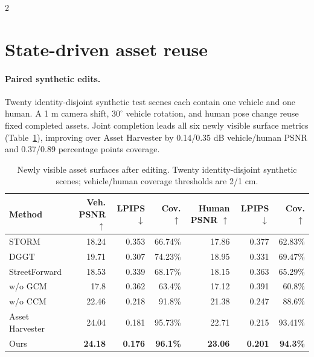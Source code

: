 \begin{multicols}{2}
\section{State-driven asset reuse}
\label{sec:supp-reuse}

\paragraph{Paired synthetic edits.}
Twenty identity-disjoint synthetic test scenes each contain one vehicle and one human. A 1 m camera shift, $30^\circ$ vehicle rotation, and human pose change reuse fixed completed assets. Joint completion leads all six newly visible surface metrics (Table~\ref{tab:asset-reuse}), improving over Asset Harvester by 0.14/0.35 dB vehicle/human PSNR and 0.37/0.89 percentage points coverage.

\end{multicols}
\begin{table}[H]
\centering\small
\setlength{\tabcolsep}{4pt}
\caption{Newly visible asset surfaces after editing. Twenty identity-disjoint synthetic scenes; vehicle/human coverage thresholds are 2/1 cm.}
\label{tab:asset-reuse}
\begin{tabular}{@{}lrrrrrr@{}}
\toprule
Method & Veh. PSNR $\uparrow$ & LPIPS $\downarrow$ & Cov. $\uparrow$ & Human PSNR $\uparrow$ & LPIPS $\downarrow$ & Cov. $\uparrow$ \\
\midrule
STORM & 18.24 & 0.353 & 66.74\% & 17.86 & 0.377 & 62.83\% \\
DGGT & 19.71 & 0.307 & 74.23\% & 18.95 & 0.331 & 69.47\% \\
StreetForward & 18.53 & 0.339 & 68.17\% & 18.15 & 0.363 & 65.29\% \\
w/o GCM & 17.8 & 0.362 & 63.4\% & 17.12 & 0.391 & 60.8\% \\
w/o CCM & 22.46 & 0.218 & 91.8\% & 21.38 & 0.247 & 88.6\% \\
Asset Harvester & 24.04 & 0.181 & 95.73\% & 22.71 & 0.215 & 93.41\% \\
Ours & \textbf{24.18} & \textbf{0.176} & \textbf{96.1\%} & \textbf{23.06} & \textbf{0.201} & \textbf{94.3\%} \\
\bottomrule
\end{tabular}
\end{table}

